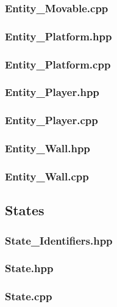 \subsubsection{Entity\_Movable.cpp}

\subsubsection{Entity\_Platform.hpp}

\subsubsection{Entity\_Platform.cpp}

\subsubsection{Entity\_Player.hpp}

\subsubsection{Entity\_Player.cpp}

\subsubsection{Entity\_Wall.hpp}

\subsubsection{Entity\_Wall.cpp}


\subsection{States}
\subsubsection{State\_Identifiers.hpp}

\subsubsection{State.hpp}

\subsubsection{State.cpp}

